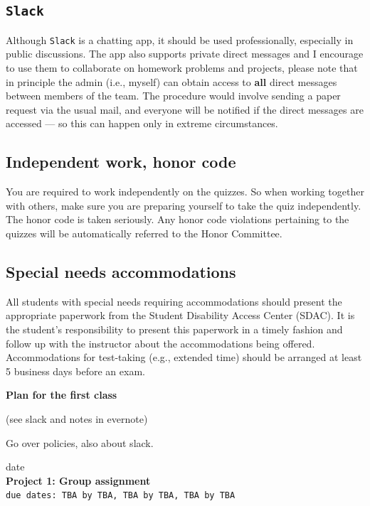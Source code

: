 \documentclass[oneside,11pt]{amsart}
\newcommand{\note}[1]{{\Large\sf{}\color{blue}(#1)}}
\begin{document}
\subsection{\texttt{Slack}}

Although \texttt{Slack} is a chatting app,
it should be used professionally, especially in public discussions.
The app also supports private direct messages and I encourage
to use them to collaborate on homework problems and projects, please
note that in principle the admin (i.e., myself) can obtain access to 
\textbf{all} direct messages between members of the team. The procedure would involve sending a 
paper request via the usual mail, and everyone will be notified if the direct messages are accessed ---
so this can happen only in extreme circumstances.

\subsection{Independent work, honor code}
You are required to work independently on the quizzes. So when working together with others, make sure you are preparing yourself to take the quiz independently.
The honor code is taken seriously. Any honor code violations pertaining to the quizzes will be automatically referred to the Honor Committee.

\subsection{Special needs accommodations}
All students with special needs requiring accommodations should present the appropriate paperwork from the Student Disability Access Center (SDAC). It is the student's responsibility to present this paperwork in a timely fashion and follow up with the instructor about the accommodations being offered. Accommodations for test-taking (e.g., extended time) should be arranged at least 5 business days before an exam.

\newpage

\begin{center}
	{\large\textbf{Plan for the first class}}
\end{center}

\note{see slack and notes in evernote}

Go over policies, also about slack.


\newpage

\begin{center}
	\hfill date
	\\
	{\large\textbf{Project 1: Group assignment}}
	\\
	\texttt{due dates: TBA by TBA, TBA by TBA, TBA by TBA}
\end{center}
\end{document}

